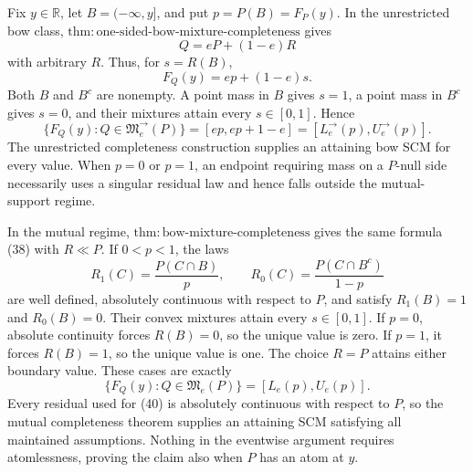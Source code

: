 Fix \(y\in\mathbb R\), let \(B=(-\infty,y]\), and put \(p=P(B)=F_P(y)\).  In the unrestricted bow class, \(\mathrm{thm:one\text{-}sided\text{-}bow\text{-}mixture\text{-}completeness}\) gives
\[
 Q=eP+(1-e)R
\]
with arbitrary \(R\).  Thus, for \(s=R(B)\),
\[
 F_Q(y)=ep+(1-e)s. \tag{38}
\]
Both \(B\) and \(B^c\) are nonempty.  A point mass in \(B\) gives \(s=1\), a point mass in \(B^c\) gives \(s=0\), and their mixtures attain every \(s\in[0,1]\).  Hence
\[
 \{F_Q(y):Q\in\mathfrak M^{\to}_e(P)\}
 =[ep,ep+1-e]=[L^{\to}_e(p),U^{\to}_e(p)]. \tag{39}
\]
The unrestricted completeness construction supplies an attaining bow SCM for every value.  When \(p=0\) or \(p=1\), an endpoint requiring mass on a \(P\)-null side necessarily uses a singular residual law and hence falls outside the mutual-support regime.

In the mutual regime, \(\mathrm{thm:bow\text{-}mixture\text{-}completeness}\) gives the same formula (38) with \(R\ll P\).  If \(0<p<1\), the laws
\[
 R_1(C)=\frac{P(C\cap B)}p,
 \qquad
 R_0(C)=\frac{P(C\cap B^c)}{1-p}
\]
are well defined, absolutely continuous with respect to \(P\), and satisfy \(R_1(B)=1\) and \(R_0(B)=0\).  Their convex mixtures attain every \(s\in[0,1]\).  If \(p=0\), absolute continuity forces \(R(B)=0\), so the unique value is zero.  If \(p=1\), it forces \(R(B)=1\), so the unique value is one.  The choice \(R=P\) attains either boundary value.  These cases are exactly
\[
 \{F_Q(y):Q\in\mathfrak M_e(P)\}=[L_e(p),U_e(p)]. \tag{40}
\]
Every residual used for (40) is absolutely continuous with respect to \(P\), so the mutual completeness theorem supplies an attaining SCM satisfying all maintained assumptions.  Nothing in the eventwise argument requires atomlessness, proving the claim also when \(P\) has an atom at \(y\).